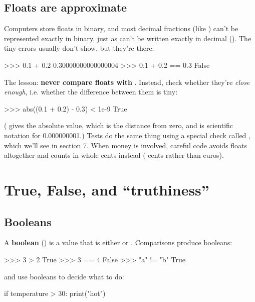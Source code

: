 \documentclass[10pt,a4paper]{article}
\begin{document}
\subsection{Floats are approximate}
Computers store floats in binary, and most decimal fractions (like ) can’t be represented exactly in binary, just as  can’t be written exactly in decimal (). The tiny errors usually don’t show, but they’re there:
\begin{txtcode}
>>> 0.1 + 0.2
0.30000000000000004
>>> 0.1 + 0.2 == 0.3
False
\end{txtcode}
The lesson: \textbf{never compare floats with \code{=\allowbreak{}=\allowbreak{}}}. Instead, check whether they’re \emph{close enough}, i.e. whether the difference between them is tiny:
\begin{txtcode}
>>> abs((0.1 + 0.2) - 0.3) < 1e-9
True
\end{txtcode}
( gives the absolute value, which is the distance from zero, and  is scientific notation for 0.000000001.)
Tests do the same thing using a special check called , which we’ll see in section 7. When money is involved, careful code avoids floats altogether and counts in whole cents instead ( cents rather than  euros).
\setcounter{section}{2}
\section{True, False, and “truthiness”}
\subsection{Booleans}
A \textbf{boolean} () is a value that is either  or . Comparisons produce booleans:
\begin{txtcode}
>>> 3 > 2
True
>>> 3 == 4
False
>>> "a" != "b"
True
\end{txtcode}
 and  use booleans to decide what to do:
\begin{pycode}
if temperature > 30:
    print("hot")
\end{pycode}
\end{document}
